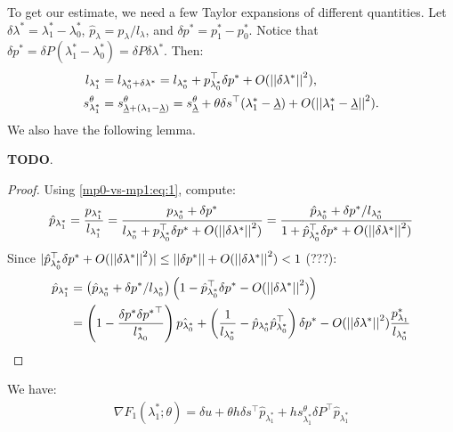 \documentclass[eikonal.tex]{subfiles}
\begin{document}
To get our estimate, we need a few Taylor expansions of different
quantities. Let $\delta \lambda^* = \lambda_1^* - \lambda_0^*$,
$\hat{p}_\lambda = p_\lambda/l_\lambda$, and
$\delta p^* = p_1^* - p_0^*$. Notice that
$\delta p^* = \delta P
(\lambda_1^* - \lambda_0^*) = \delta P \delta \lambda^*$.  Then:
\begin{align}
  l_{\lambda_1^*} &= l_{\lambda_0^* + \delta \lambda^*} = l_{\lambda_0^*} + p_{\lambda_0^*}^\top \delta p^* + O(\left|\left|\delta \lambda^*\right|\right|^2),\label{mp0-vs-mp1:eq:1} \\
  s_{\lambda_1^*}^\theta &= s_{\underline{\lambda} + (\lambda_1 - \underline{\lambda})}^\theta  = s_{\underline{\lambda}}^\theta + \theta \delta s^\top {(\lambda_1^* - \underline\lambda)} + O(\left|\left|\lambda_1^* - \underline\lambda\right|\right|^2).\label{mp0-vs-mp1:eq:2}
\end{align}
We also have the following lemma.

\begin{lemma}
  \textbf{TODO}.
\end{lemma}

\begin{proof}
  Using \cref{mp0-vs-mp1:eq:1}, compute:
  \begin{equation*}
    \hat{p}_{\lambda_1^*} = \frac{p_{\lambda_1^*}}{l_{\lambda_1^*}} = \frac{p_{\lambda_0^*} + \delta p^*}{l_{\lambda_0^*} + p_{\lambda_0^*}^\top \delta p^* + O(\left|\left|\delta \lambda^*\right|\right|^2)}
    = \frac{\hat{p}_{\lambda_0^*} + \delta p^* / l_{\lambda_0^*}}{1 + \hat{p}_{\lambda_0^*}^\top \delta p^* + O(\left|\left|\delta \lambda^*\right|\right|^2)}
  \end{equation*}
  Since
  $|\hat{p}_{\lambda_0^*}^\top \delta p^* + O(\left|\left|\delta \lambda^*\right|\right|^2)| \leq \left|\left|\delta p^*\right|\right| + O(\left|\left|\delta \lambda^*\right|\right|^2) < 1$ (???):
  \begin{align*}
    \hat{p}_{\lambda_1^*}
    &= \left(\hat{p}_{\lambda_0^*} + \delta p^* / l_{\lambda_0^*}\right) \left(1 - \hat{p}_{\lambda_0^*}^\top \delta p^* - O(\left|\left|\delta \lambda^*\right|\right|^2)\right) \\
    &= \left(1 - \frac{\delta p^* {\delta p^*}^\top}{l_{\lambda_0}^*}\right) \hat{p_{\lambda_0^*}} + \left(\frac{1}{l_{\lambda_0^*}} - \hat{p}_{\lambda_0^*} \hat{p}_{\lambda_0^*}^\top\right) \delta p^* - O(\left|\left|\delta \lambda^*\right|\right|^2) \frac{p_{\lambda_1}^*}{l_{\lambda_0^*}}
  \end{align*}
\end{proof}

We have:
\begin{align*}
  \nabla F_1(\lambda_1^*; \theta) = \delta u + \theta h \delta s^\top \hat{p}_{\lambda_1^*} + h s_{\lambda_1^*}^\theta \delta P^\top \hat{p}_{\lambda_1^*}
\end{align*}
\end{document}
